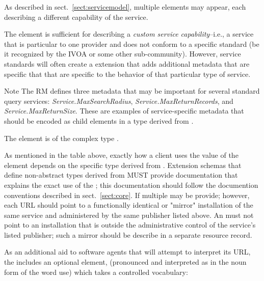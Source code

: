 \documentclass[11pt,a4paper]{ivoa}
\begin{document}

As described in sect.~\ref{sect:servicemodel}, multiple
 elements may appear, each describing a
different capability of the service.  




The  element is sufficient for describing a
\emph{custom service capability}--i.e., a service that is
particular to one provider and does not conform to a specific standard 
(be it recognized by the IVOA or some other sub-community).  However,
service standards will often create a 
extension that adds additional metadata that are specific that that
are specific to the behavior of that particular type of service.  



\begin{admonition}{Note}
The RM defines three metadata that may be
important for several standard query services:
\emph{Service.MaxSearchRadius},
\emph{Service.MaxReturnRecords}, and
\emph{Service.MaxReturnSize}.  These are examples of
service-specific metadata that should be encoded as child
elements in a type derived from .  
\end{admonition}


The  element is of the complex type 
.




As mentioned in the table above, exactly how a client uses the value
of the  element depends on the specific
type derived from .  Extension schemas that
define non-abstract types derived from  MUST
provide documentation that explains the exact use of the
; this documentation should follow the
documention conventions described in sect.~\ref{sect:core}.  If multiple
 may be provide; however, each URL should
point to a functionally identical or "mirror" installation of the same
service and administered by the same publisher listed above.  An
 must not point to an installation
that is outside the administrative control of the service's listed
publisher; such a mirror should be describe in a separate resource
record.  



As an additional aid to software agents that will attempt to interpret
its URL, the  includes an optional element,
 (pronounced and interpreted as in the noun form of
the word use) which takes a controlled vocabulary:
\end{document}
